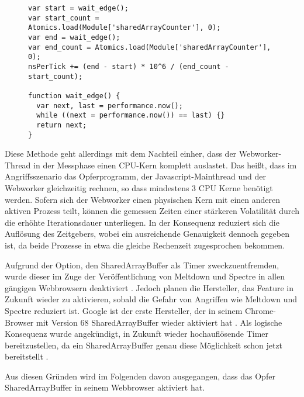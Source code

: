 \begin{figure}[h]
\begin{lstlisting}[caption=main.js: Code welcher die Timerauflösung bestimmt,label=alg_list:getResolutionNS]
var start = wait_edge();
var start_count = Atomics.load(Module['sharedArrayCounter'], 0);
var end = wait_edge();
var end_count = Atomics.load(Module['sharedArrayCounter'], 0);
nsPerTick += (end - start) * 10^6 / (end_count - start_count);

function wait_edge() {
  var next, last = performance.now();
  while ((next = performance.now()) == last) {}
  return next;
}
\end{lstlisting}
\end{figure}

Diese Methode geht allerdings mit dem Nachteil einher, dass der Webworker-Thread in der Messphase einen CPU-Kern komplett auslastet. Das heißt, dass im Angriffsszenario das Opferprogramm, der Javascript-Mainthread und der Webworker gleichzeitig rechnen, so dass mindestens 3 CPU Kerne benötigt werden. 
Sofern sich der Webworker einen physischen Kern mit einen anderen aktiven Prozess teilt, können die gemessen Zeiten einer stärkeren Volatilität durch die erhöhte Iterationsdauer unterliegen.
In der Konsequenz reduziert sich die Auflösung des Zeitgebers, wobei ein ausreichende Genauigkeit dennoch gegeben ist, da beide Prozesse in etwa die gleiche Rechenzeit zugesprochen bekommen.

Aufgrund der Option, den SharedArrayBuffer als Timer zweckzuentfremden, wurde dieser im Zuge der Veröffentlichung von Meltdown und Spectre in allen gängigen Webbrowsern deaktiviert \cite{FirefoxSharedArrayBuffer}. Jedoch planen die Hersteller, das Feature in Zukunft wieder zu aktivieren, sobald die Gefahr von Angriffen wie Meltdown und Spectre reduziert ist. 
Google ist der erste Hersteller, der in seinem Chrome-Browser mit Version 68 SharedArrayBuffer wieder aktiviert hat \cite{ChromeSharedArrayBufferAgain}. 
Als logische Konsequenz wurde angekündigt, in Zukunft wieder hochauflösende Timer bereitzustellen, da ein SharedArrayBuffer genau diese Möglichkeit schon jetzt bereitstellt \cite{ChromeHighResolutionTimerAgain}.

Aus diesen Gründen wird im Folgenden davon ausgegangen, dass das Opfer SharedArrayBuffer in seinem Webbrowser aktiviert hat.


